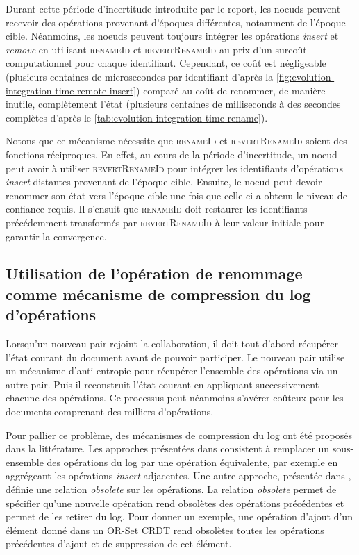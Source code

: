 \documentclass[12pt]{thesul}
\begin{document}
Durant cette période d'incertitude introduite par le report, les noeuds peuvent recevoir des opérations provenant d'époques différentes, notamment de l'époque cible.
Néanmoins, les noeuds peuvent toujours intégrer les opérations \emph{insert} et \emph{remove} en utilisant \textsc{renameId} et \textsc{revertRenameId} au prix d'un surcoût computationnel pour chaque identifiant.
Cependant, ce coût est négligeable (plusieurs centaines de microsecondes par identifiant d'après la \autoref{fig:evolution-integration-time-remote-insert}) comparé au coût de renommer, de manière inutile, complètement l'état (plusieurs centaines de milliseconds à des secondes complètes d'après le \autoref{tab:evolution-integration-time-rename}).

Notons que ce mécanisme nécessite que \textsc{renameId} et \textsc{revertRenameId} soient des fonctions réciproques.
En effet, au cours de la période d'incertitude, un noeud peut avoir à utiliser \textsc{revertRenameId} pour intégrer les identifiants d'opérations \emph{insert} distantes provenant de l'époque cible.
Ensuite, le noeud peut devoir renommer son état vers l'époque cible une fois que celle-ci a obtenu le niveau de confiance requis.
Il s'ensuit que \textsc{renameId} doit restaurer les identifiants précédemment transformés par \textsc{revertRenameId} à leur valeur initiale pour garantir la convergence.

\subsection{Utilisation de l'opération de renommage comme mécanisme de compression du log d'opérations}

\label{sec:rename-as-compression-mechanism}

Lorsqu'un nouveau pair rejoint la collaboration, il doit tout d'abord récupérer l'état courant du document avant de pouvoir participer.
Le nouveau pair utilise un mécanisme d'anti-entropie \cite{1983-anti-entropy-vv} pour récupérer l'ensemble des opérations via un autre pair.
Puis il reconstruit l'état courant en appliquant successivement chacune des opérations.
Ce processus peut néanmoins s'avérer coûteux pour les documents comprenant des milliers d'opérations.

Pour pallier ce problème, des mécanismes de compression du log ont été proposés dans la littérature.
Les approches présentées dans \cite{2002-log-compression-op-based-vcs-shen-sun, 2006-these-claudia} consistent à remplacer un sous-ensemble des opérations du log par une opération équivalente, par exemple en aggrégeant les opérations \emph{insert} adjacentes.
Une autre approche, présentée dans \cite{2014-making-op-based-crdts-op-based}, définie une relation \emph{obsolete} sur les opérations.
La relation \emph{obsolete} permet de spécifier qu'une nouvelle opération rend obsolètes des opérations précédentes et permet de les retirer du log.
Pour donner un exemple, une opération d'ajout d'un élément donné dans un OR-Set \ac{CRDT} rend obsolètes toutes les opérations précédentes d'ajout et de suppression de cet élément.
\end{document}
